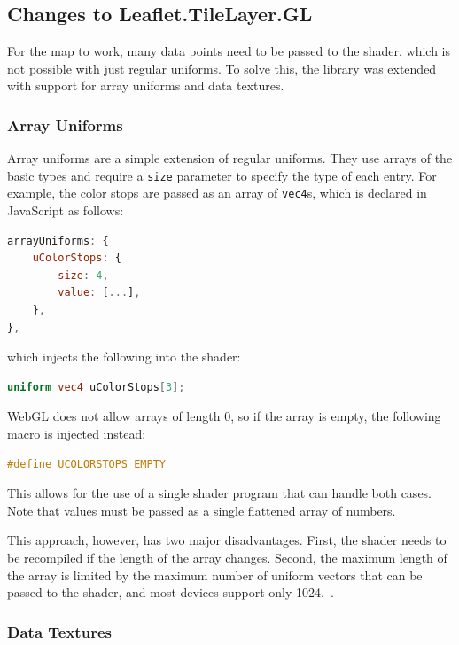 \subsection{Changes to Leaflet.TileLayer.GL}\label{subsec:tlgl_changes}

For the map to work, many data points need to be passed to the shader, which is not possible with just regular uniforms. To solve this, the library was extended with support for array uniforms and data textures.

\subsubsection{Array Uniforms}

Array uniforms are a simple extension of regular uniforms. They use arrays of the basic types and require a \verb|size| parameter to specify the type of each entry. For example, the color stops are passed as an array of \verb|vec4|s, which is declared in JavaScript as follows:
\begin{lstlisting}[language=JavaScript,caption=Passing Color Stops as Array Uniforms]
arrayUniforms: {
    uColorStops: {
        size: 4,
        value: [...],
    },
},
\end{lstlisting}
which injects the following into the shader:
\begin{lstlisting}[language=GLSL,caption=Injected Array Uniforms]
uniform vec4 uColorStops[3];
\end{lstlisting}
WebGL does not allow arrays of length 0, so if the array is empty, the following macro is injected instead:
\begin{lstlisting}[language=GLSL,caption=Empty Array Macro]
#define UCOLORSTOPS_EMPTY
\end{lstlisting}

This allows for the use of a single shader program that can handle both cases. Note that values must be passed as a single flattened array of numbers.

This approach, however, has two major disadvantages. First, the shader needs to be recompiled if the length of the array changes. Second, the maximum length of the array is limited by the maximum number of uniform vectors that can be passed to the shader, and most devices support only 1024.\ \cite{webglsurvey:uniform_vectors}\@.

\subsubsection{Data Textures}

